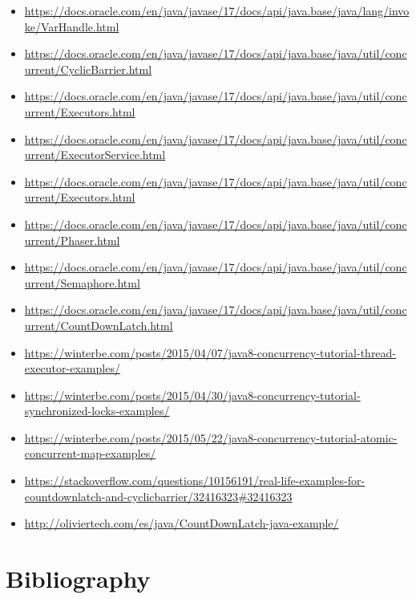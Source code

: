 \documentclass{latex/classes/thesis}
\begin{document}
\begin{itemize}
\item \url{https://docs.oracle.com/en/java/javase/17/docs/api/java.base/java/lang/invoke/VarHandle.html}
\item \url{https://docs.oracle.com/en/java/javase/17/docs/api/java.base/java/util/concurrent/CyclicBarrier.html}
\item \url{https://docs.oracle.com/en/java/javase/17/docs/api/java.base/java/util/concurrent/Executors.html}
\item \url{https://docs.oracle.com/en/java/javase/17/docs/api/java.base/java/util/concurrent/ExecutorService.html}
\item \url{https://docs.oracle.com/en/java/javase/17/docs/api/java.base/java/util/concurrent/Executors.html}
\item \url{https://docs.oracle.com/en/java/javase/17/docs/api/java.base/java/util/concurrent/Phaser.html}
\item \url{https://docs.oracle.com/en/java/javase/17/docs/api/java.base/java/util/concurrent/Semaphore.html}
\item \url{https://docs.oracle.com/en/java/javase/17/docs/api/java.base/java/util/concurrent/CountDownLatch.html}
\item \url{https://winterbe.com/posts/2015/04/07/java8-concurrency-tutorial-thread-executor-examples/}
\item \url{https://winterbe.com/posts/2015/04/30/java8-concurrency-tutorial-synchronized-locks-examples/}
\item \url{https://winterbe.com/posts/2015/05/22/java8-concurrency-tutorial-atomic-concurrent-map-examples/}
\item \url{https://stackoverflow.com/questions/10156191/real-life-examples-for-countdownlatch-and-cyclicbarrier/32416323\#32416323}
\item \url{http://oliviertech.com/es/java/CountDownLatch-java-example/}
\end{itemize}


\chapter{Bibliography}
\label{sec:orgb553875}


\end{document}
